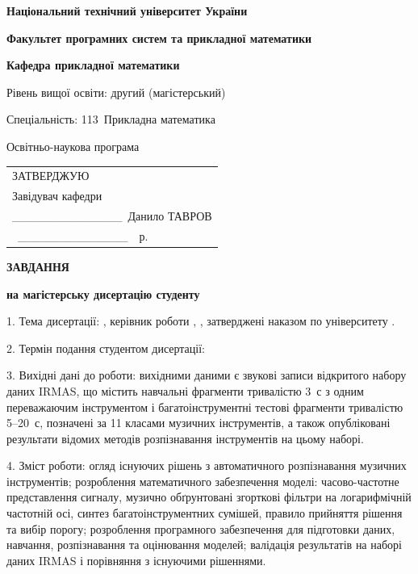 \pagestyle{empty}
\setlength{\parindent}{0cm}

{\centering
    \textbf{Національний технічний університет України}

    \textbf{}

    \textbf{Факультет програмних систем та прикладної математики}

    \textbf{Кафедра прикладної математики}

}

{\raggedright
Рівень вищої освіти: другий (магістерський)

Спеціальність: 113~Прикладна математика

Освітньо-наукова програма 

}

\addvspace{12pt}

\begin{flushright}
	\renewcommand{\arraystretch}{0.8}
	\begin{tabular}{l}
		\MakeUppercase{Затверджую} \\
		Завідувач кафедри \\
		\_\_\_\_\_\_\_\_\_\_\_\_\_~Данило ТАВРОВ \\
		\quotes{\_\_\_\_}~\_\_\_\_\_\_\_\_\_\_\_\_\_~\the\year~р. \\
	\end{tabular}
\end{flushright}

{\centering
	\textbf{\MakeUppercase{Завдання}}
	
	\textbf{на магістерську дисертацію студенту}

	\reportAuthorGen

}

1. Тема дисертації: \quotes{\reportTitle},
керівник роботи \supervisorFio, \supervisorRegalia, затверджені наказом по університету \reportOrder.

2. Термін подання студентом дисертації: \applicationDate

3. Вихідні дані до роботи: вихідними даними є звукові записи відкритого набору даних IRMAS, що містить навчальні фрагменти тривалістю 3~с з одним переважаючим інструментом і багатоінструментні тестові фрагменти тривалістю 5--20~с, позначені за 11 класами музичних інструментів, а також опубліковані результати відомих методів розпізнавання інструментів на цьому наборі.

4. Зміст роботи: огляд існуючих рішень з автоматичного розпізнавання музичних інструментів; розроблення математичного забезпечення моделі: часово-частотне представлення сигналу, музично обґрунтовані згорткові фільтри на логарифмічній частотній осі, синтез багатоінструментних сумішей, правило прийняття рішення та вибір порогу; розроблення програмного забезпечення для підготовки даних, навчання, розпізнавання та оцінювання моделей; валідація результатів на наборі даних IRMAS і порівняння з існуючими рішеннями.

